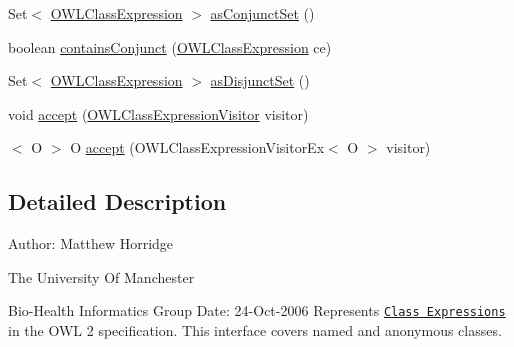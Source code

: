 \begin{DoxyCompactItemize}
Set$<$ \hyperlink{interfaceorg_1_1semanticweb_1_1owlapi_1_1model_1_1_o_w_l_class_expression}{O\-W\-L\-Class\-Expression} $>$ \hyperlink{interfaceorg_1_1semanticweb_1_1owlapi_1_1model_1_1_o_w_l_class_expression_ab38673ec77e0dcea96793c21b11a0c77}{as\-Conjunct\-Set} ()
\item 
boolean \hyperlink{interfaceorg_1_1semanticweb_1_1owlapi_1_1model_1_1_o_w_l_class_expression_a4535549f29fa64df00645dfc20a6d0b5}{contains\-Conjunct} (\hyperlink{interfaceorg_1_1semanticweb_1_1owlapi_1_1model_1_1_o_w_l_class_expression}{O\-W\-L\-Class\-Expression} ce)
\item 
Set$<$ \hyperlink{interfaceorg_1_1semanticweb_1_1owlapi_1_1model_1_1_o_w_l_class_expression}{O\-W\-L\-Class\-Expression} $>$ \hyperlink{interfaceorg_1_1semanticweb_1_1owlapi_1_1model_1_1_o_w_l_class_expression_af8ffcf900eec6c252e13f641c139e5d8}{as\-Disjunct\-Set} ()
\item 
void \hyperlink{interfaceorg_1_1semanticweb_1_1owlapi_1_1model_1_1_o_w_l_class_expression_aee5d73877e0430cf3bec907cbcd87d5e}{accept} (\hyperlink{interfaceorg_1_1semanticweb_1_1owlapi_1_1model_1_1_o_w_l_class_expression_visitor}{O\-W\-L\-Class\-Expression\-Visitor} visitor)
\item 
$<$ O $>$ O \hyperlink{interfaceorg_1_1semanticweb_1_1owlapi_1_1model_1_1_o_w_l_class_expression_a2ab661028caa89cfc1e605f0f48cb495}{accept} (O\-W\-L\-Class\-Expression\-Visitor\-Ex$<$ O $>$ visitor)
\end{DoxyCompactItemize}


\subsection{Detailed Description}
Author\-: Matthew Horridge\par
 The University Of Manchester\par
 Bio-\/\-Health Informatics Group Date\-: 24-\/\-Oct-\/2006 Represents \href{http://www.w3.org/TR/2009/REC-owl2-syntax-20091027/#Class_Expressions}{\tt Class Expressions} in the O\-W\-L 2 specification. This interface covers named and anonymous classes. 

